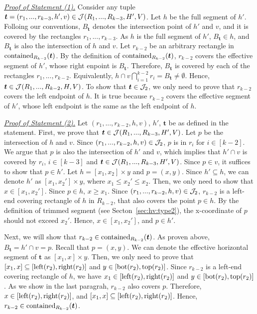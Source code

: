 \noindent \underline{\em Proof of Statement (1).} Consider any tuple $\textrm{\boldmath${t}$} = (r_1,...,r_{k-3}, h', v) \in \mathcal{J}(R_1,...,R_{k-3},H',V)$. Let $h$ be the full segment of $h'$. Folloing our conventions, $B_\bm{t}$ denotes the intersection point of $h'$ and $v$, and it is covered by the rectangles $r_1,...,r_{k-3}$. As $h$ is the full segment of $h'$, $B_\bm{t} \in h$, and $B_\bm{t}$ is also the intersection of $h$ and $v$. Let $r_{k-2}$ be an arbitrary rectangle in $\mathrm{contained}_{R_{k-2}}(\textrm{\boldmath${t}$})$. By the definition of $\mathrm{contained}_{R_{k-2}}(\textrm{\boldmath${t}$})$, $r_{k-2}$ covers the effective segment of $h'$, whose right enpoint is $B_{\bm{t}}$. Therefore, $B_{\bm{t}}$ is covered by each of the rectangles $r_1,...,r_{k-2}$. Equivalently, $h \cap v \bigcap_{i = 1}^{k-2} r_i = B_\bm{t} \neq \emptyset$. Hence,
$\textrm{\boldmath${t}$} \in \mathcal{J}(R_1,...,R_{k-2},H,V)$. To show that $\textrm{\boldmath${t}$} \in \mathcal{J}_2$, we only need to prove that $r_{k-2}$ covers the left endpoint of $h$. It is true because $r_{k-2}$ covers the effective segment of $h'$, whose left endpoint is the same as the left endpoint of $h$. 

\vgap 

\noindent \underline{\em Proof of Statement (2).} Let $(r_1,...,r_{k-2},h,v)$, $h'$, $\bm{t}$ be as defined in the statement. First, we prove that $\textrm{\boldmath${t}$}\in \mathcal{J}(R_1,...,R_{k-3}, H', V)$.
Let $p$ be the intersection of $h$ and $v$. Since $(r_1,...,r_{k-2},h,v)\in \mathcal{J}_2$, $p$ is in $r_i$ for $i \in [k-2]$.
We argue that $p$ is also the intersection of $h'$ and $v$, which implies that $h'\cap v$ is covered by $r_i$, $i \in [k-3]$ and $\textrm{\boldmath${t}$} \in \mathcal{J}(R_1,...,R_{k-3},H',V)$. Since $p \in v$, it suffices to show that $p \in h'$. Let $h = [x_1,x_2]\times y$ and $p = (x,y)$. Since $h' \subseteq h$, we can denote $h'$ as $[x_1, x_2'] \times y$, where $x_1 \le x_2' \le x_2$. Then, we only need to show that $x \in [x_1, x_2']$. Since $p \in h$, $x \ge x_1$. Since $(r_1,...,r_{k-2},h,v) \in \mathcal{J}_2$, $r_{k-2}$ is a left-end covering rectangle of $h$ in $R_{k-2}$, that also covers the point $p \in h$. By the definition of trimmed segment (see Secton~\ref{sec:hv:type2}), the x-coordinate of $p$ should not exceed $x_2'$. Hence, $x \in [x_1, x_2']$, and $p \in h'$.

\vgap 

Next, we will show that $r_{k-2}\in \mathrm{contained}_{R_{k-2}}(\textrm{\boldmath${t}$})$. As proven above, $B_\bm{t} = h'\cap v = p$. Recall that $p = (x,y)$. We can denote the effective horizontal segment of $\bm{t}$ as $[x_1, x] \times y$. Then, we only need to prove that $[x_1,x] \subseteq [\mathrm{left}(r_2), \mathrm{right}(r_2)]$ and $y \in [\mathrm{bot}(r_2), \mathrm{top}(r_2)]$. Since $r_{k-2}$ is a left-end covering rectangle of $h$, we have  $x_1 \in [\mathrm{left}(r_2), \mathrm{right}(r_2)]$ and $y \in [\mathrm{bot}(r_2), \mathrm{top}(r_2)]$. As we show in the last paragrah, $r_{k-2}$ also covers $p$. Therefore, $x \in [\mathrm{left}(r_2), \mathrm{right}(r_2)]$, and $[x_1,x] \subseteq [\mathrm{left}(r_2), \mathrm{right}(r_2)]$. Hence, $r_{k-2}\in \mathrm{contained}_{R_{k-2}}(\textrm{\boldmath${t}$})$.

